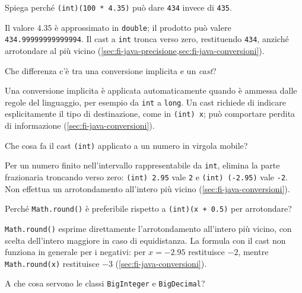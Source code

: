 \begin{exercise}
\label{ex:fi-esercizi-java-collaudo-cast-435}
Spiega perché \texttt{(int)(100 * 4.35)} può dare \texttt{434}
invece di \texttt{435}.
\end{exercise}

Il valore \(4.35\) è approssimato in \texttt{double}; il prodotto può
valere \texttt{434.99999999999994}. Il cast a \texttt{int} tronca verso zero,
restituendo \texttt{434}, anziché arrotondare al più vicino
(\cref{sec:fi-java-precisione,sec:fi-java-conversioni}).

\begin{exercise}
\label{ex:fi-esercizi-java-collaudo-conversione-cast}
Che differenza c'è tra una conversione implicita e un \emph{cast}?
\end{exercise}

Una conversione implicita è applicata automaticamente quando è ammessa
dalle regole del linguaggio, per esempio da \texttt{int} a
\texttt{long}. Un cast richiede di indicare esplicitamente il tipo di
destinazione, come in \texttt{(int) x}; può comportare perdita di
informazione (\cref{sec:fi-java-conversioni}).

\begin{exercise}
\label{ex:fi-esercizi-java-collaudo-cast-int}
Che cosa fa il cast \texttt{(int)} applicato a un numero in virgola mobile?
\end{exercise}

Per un numero finito nell'intervallo rappresentabile da
\texttt{int}, elimina la parte frazionaria troncando verso zero:
\texttt{(int) 2.95} vale \texttt{2} e
\texttt{(int) (-2.95)} vale \texttt{-2}. Non effettua un
arrotondamento all'intero più vicino
(\cref{sec:fi-java-conversioni}).

\begin{exercise}
\label{ex:fi-esercizi-java-collaudo-math-round}
Perché \texttt{Math.round()} è preferibile rispetto a
\texttt{(int)(x + 0.5)} per arrotondare?
\end{exercise}

\texttt{Math.round()} esprime direttamente l'arrotondamento
all'intero più vicino, con scelta dell'intero maggiore in caso
di equidistanza. La formula con il cast non funziona in generale
per i negativi: per \(x=-2.95\) restituisce \(-2\), mentre
\texttt{Math.round(x)} restituisce \(-3\)
(\cref{sec:fi-java-conversioni}).

\begin{exercise}
\label{ex:fi-esercizi-java-collaudo-big-number}
A che cosa servono le classi \texttt{BigInteger} e
\texttt{BigDecimal}?
\end{exercise}

